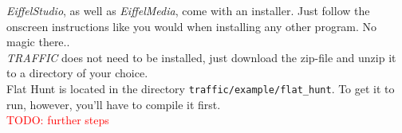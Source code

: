 \emph{EiffelStudio}, as well as \emph{EiffelMedia}, come with an installer. Just follow the onscreen instructions like you would when installing any other program. No magic there..\\

\emph{TRAFFIC} does not need to be installed, just download the zip-file and unzip it to a directory of your choice.\\ 
Flat Hunt is located in the directory \texttt{traffic/example/flat\_hunt}. To get it to run, however, you'll have to compile it first.\\

\textcolor{red}{TODO: further steps}

